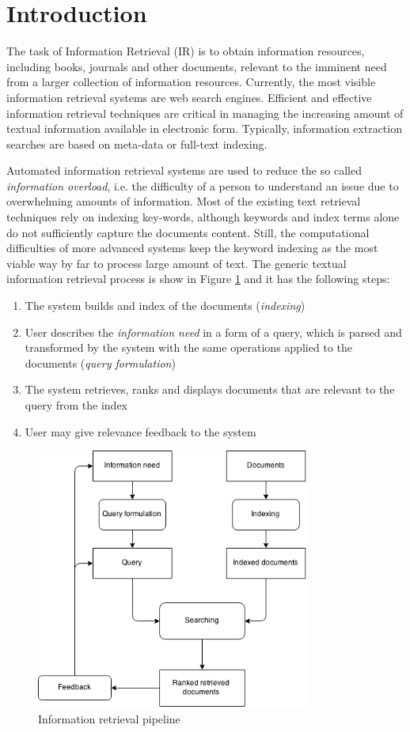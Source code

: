 \section{Introduction}

The task of Information Retrieval (IR) is to obtain information resources, including books, journals and other documents, relevant to the imminent need from a larger collection of information resources. Currently, the most visible information retrieval systems are web search engines. Efficient and effective information retrieval techniques are critical in managing the increasing amount of textual information available in electronic form. Typically, information extraction searches are based on meta-data or full-text indexing.

Automated information retrieval systems are used to reduce the so called \textit{information overload}, i.e. the difficulty of a person to understand an issue due to overwhelming amounts of information. Most of the existing text retrieval techniques rely on indexing key-words, although keywords and index terms alone do not sufficiently capture the documents content. Still, the computational difficulties of more advanced systems keep the keyword indexing as the most viable way by far to process large amount of text. 
The generic textual information retrieval process is show in Figure \ref{fig:IR} and it has the following steps:
\begin{enumerate}
  \item The system builds and index of the documents (\textit{indexing}) 
  \item User describes the \textit{information need} in a form of a query, which is parsed and transformed by the system with the same operations applied to the documents (\textit{query formulation})
  \item The system retrieves, ranks and displays documents that are relevant to the query from the index
  \item User may give relevance feedback to the system
\end{enumerate}
\begin{figure}[ht]
	\centering
	\includegraphics[width=0.8\textwidth]{IR.png}
	\caption{Information retrieval pipeline \citep{hiemstra2009information}}
	\label{fig:IR}
\end{figure}

